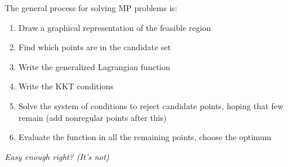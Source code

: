 The general process for solving MP problems is: 
\begin{enumerate}
	\item Draw a graphical representation of the feasible region
	
	\item Find which points are in the candidate set
	
	\item Write the generalized Lagrangian function
	
	\item Write the KKT conditions
	
	\item Solve the system of conditions to reject candidate points, hoping that few remain (add nonregular points after this)
	
	\item Evaluate the function in all the remaining points, choose the optimum
\end{enumerate}

\textit{Easy enough right? (It's not)}